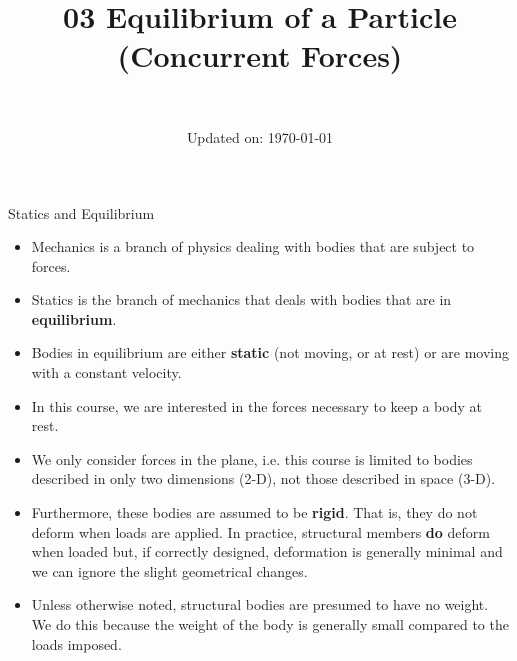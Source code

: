 \documentclass[9pt, xcolor={svgnames, x11names},professionalfonts]{beamer}
\title[Equilibrium of a Particle/Concurrent Forces]{\Huge 03 Equilibrium of a Particle \\(Concurrent Forces)}
\subtitle[Engineering Statics]{\Large\textcolor{white}{Engineering Statics}}
\author{}
\date{\small Updated on: \today}
\begin{document}

\begin{frame}[plain]    %
	\titlepage
\end{frame}


\begin{frame}{Statics and Equilibrium}
	\small
	\begin{itemize}
		\item Mechanics is a branch of physics dealing with bodies that are subject to forces.
		\item Statics is the branch of mechanics that deals with bodies that are in {\bf equilibrium}.
		\item Bodies in equilibrium are either {\bf static} (not moving, or at rest) or are moving with a constant velocity.
		\item In this course, we are interested in the forces necessary to keep a body at rest.
		\item We only consider forces in the plane, i.e. this course is limited to bodies described in only two dimensions (2-D), not those described in space (3-D).
		\item Furthermore, these bodies are assumed to be {\bf rigid}. That is, they do not deform when loads are applied. In practice, structural members {\bf do} deform when loaded but, if correctly designed, deformation is generally minimal and we can ignore the slight geometrical changes.
		\item Unless otherwise noted, structural bodies are presumed to have no weight. We do this because the weight of the body is generally small compared to the loads imposed. %
	\end{itemize}

\end{frame}

\end{document}
